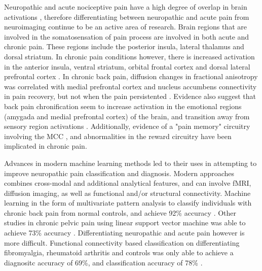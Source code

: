  Neuropathic and acute nociceptive pain have a high degree of overlap in brain activations \cite{Moisset2007}, therefore differentiating between neuropathic and acute pain from neuroimaging continue to be an active area of research. Brain regions that are involved in the somatosensation of pain process are involved in both acute and chronic pain. These regions include the posterior insula, lateral thalamus and dorsal striatum. In chronic pain conditions however, there is increased activation in the anterior insula, ventral striatum, orbital frontal cortex and dorsal lateral prefrontal cortex \cite{Jensen2016,Alomar2016,Lorenz2005}. In chronic back pain, diffusion changes in fractional anisotropy was correlated with medial prefrontal cortex and nucleus accumbens connectivity in pain recovery, but not when the pain persistented \cite{Mansour2013}. Evidence also suggest that back pain chronification seem to increase activation in the emotional regions (amygada and medial prefrontal cortex) of the brain, and transition away from sensory region activations \cite{Hashmi2013}.
 Additionally, evidence of a "pain memory" circuitry involving the MCC \cite{Vogt2016,Nevian2017}, and abnormalities in the reward circuitry \cite{Tracey2017} have been implicated in chronic pain.
 
 Advances in modern machine learning methods led to their uses in attempting to improve neuropathic pain classification and diagnosis. Modern approaches combines cross-modal and additional analytical features, and can involve fMRI, diffusion imaging, as well as functional and/or structural connectivity. Machine learning in the form of multivariate pattern analysis to classify individuals with chronic back pain from normal controls, and achieve 92\% accuracy \cite{Callan2014}. Other studies in chronic pelvic pain using linear support vector machine was able to achieve 73\% accuracy \cite{Bagarinao2014}. Differentiating neuropathic and acute pain however is more difficult. Functional connectivity based classification on differentiating fibromyalgia, rheumatoid arthritis and controls was only able to achieve a diagnositc accuracy of 69\%, and classification accuracy of 78\% \cite{Sundermann2014}.    
 
 